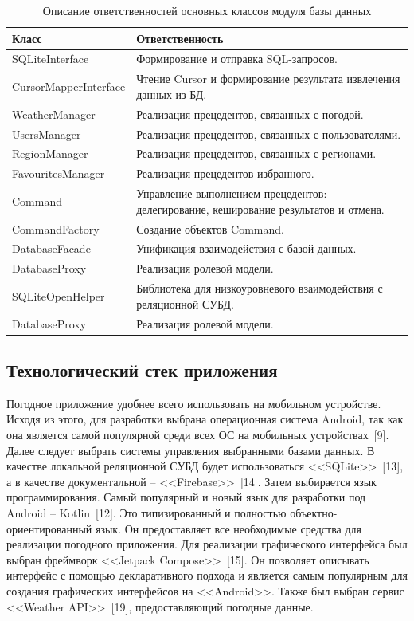 \begin{table}[h!]
    \centering
    \begin{tabular} { | m{5cm} | m{10cm} | }
        \hline
            \textbf{Класс} & \textbf{Ответственность} \\
        \hline
            SQLiteInterface & Формирование и отправка SQL-запросов. \\
        \hline
            CursorMapperInterface & Чтение Cursor и формирование результата извлечения данных из БД. \\
        \hline
            WeatherManager & Реализация прецедентов, связанных с погодой. \\
        \hline
            UsersManager & Реализация прецедентов, связанных с пользователями. \\
        \hline
            RegionManager & Реализация прецедентов, связанных с регионами. \\
        \hline
            FavouritesManager & Реализация прецедентов избранного. \\
        \hline
            Command & Управление выполнением прецедентов: делегирование, кеширование результатов и отмена. \\
        \hline
            CommandFactory & Создание объектов Command. \\
        \hline
            DatabaseFacade & Унификация взаимодействия с базой данных. \\
        \hline
            DatabaseProxy & Реализация ролевой модели. \\
        \hline
            SQLiteOpenHelper & Библиотека для низкоуровневого взаимодействия с реляционной СУБД. \\
        \hline
            DatabaseProxy & Реализация ролевой модели. \\
        \hline
        \end{tabular}
    \caption{\centering Описание ответственностей основных классов модуля базы данных}
    \label{table:responsibility}
\end{table}

\subsection{Технологический стек приложения}
Погодное приложение удобнее всего использовать на мобильном устройстве.
Исходя из этого, для разработки выбрана операционная система Android, так как она является самой популярной среди всех ОС на мобильных устройствах~[9].
Далее следует выбрать системы управления выбранными базами данных.
В качестве локальной реляционной СУБД будет использоваться <<SQLite>>~[13], а в качестве документальной -- <<Firebase>>~[14].
Затем выбирается язык программирования.
Самый популярный и новый язык для разработки под Android -- Kotlin~[12].
Это типизированный и полностью объектно-ориентированный язык.
Он предоставляет все необходимые средства для реализации погодного приложения.
Для реализации графического интерфейса был выбран фреймворк <<Jetpack Compose>>~[15].
Он позволяет описывать интерфейс с помощью декларативного подхода и является самым популярным для создания графических интерфейсов на <<Android>>.
Также был выбран сервис <<Weather API>>~[19], предоставляющий погодные данные.


